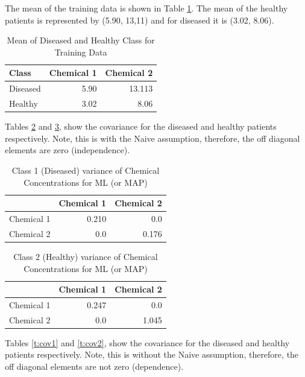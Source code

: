 The mean of the training data is shown in Table \ref{t:mean}. The mean of the healthy patients is represented by (5.90, 13,11) and for diseased it is (3.02, 8.06).

\begin{table}[h]
	\centering
	\caption{Mean of Diseased and Healthy Class for Training Data}
	\label{t:mean}
	\begin{tabular}{lrr}
		\hline
		\textbf{Class} & \textbf{Chemical 1} & \textbf{Chemical 2} \\ \hline
		Diseased & 5.90 & 13.113 \\
		Healthy & 3.02 & 8.06  \\
	\end{tabular}
\end{table}

Tables \ref{t:var1} and \ref{t:var2}, show the covariance for the diseased and healthy patients respectively. Note, this is with the Naive assumption, therefore, the off diagonal elements are zero (independence).

\begin{table}[h!]
	\centering
	\caption{Class 1 (Diseased) variance of Chemical Concentrations for ML (or MAP)}
	\label{t:var1}
	\begin{tabular}{lrr}
		\hline
		\textbf{} & \textbf{Chemical 1} & \textbf{Chemical 2} \\ \hline
		Chemical 1 & 0.210 & 0.0 \\
		Chemical 2 & 0.0 & 0.176  \\
	\end{tabular}
\end{table}

\begin{table}[h!]
	\centering
	\caption{Class 2 (Healthy) variance of Chemical Concentrations for ML (or MAP)}
	\label{t:var2}
	\begin{tabular}{lrr}
		\hline
		\textbf{} & \textbf{Chemical 1} & \textbf{Chemical 2} \\ \hline
		Chemical 1 & 0.247 & 0.0 \\
		Chemical 2 & 0.0 & 1.045 \\
	\end{tabular}
\end{table}

Tables \ref{t:cov1} and \ref{t:cov2}, show the covariance for the diseased and healthy patients respectively. Note, this is without the Naive assumption, therefore, the off diagonal elements are not zero (dependence).

